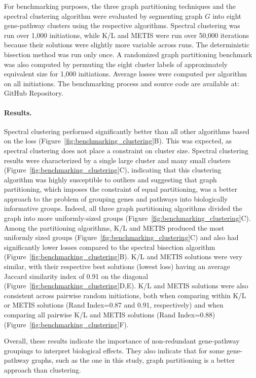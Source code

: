 \documentclass[12pt]{article}
\begin{document}
For benchmarking purposes, the three graph partitioning techniques and the spectral clustering algorithm were evaluated by segmenting graph $G$ into eight gene-pathway clusters using the respective algorithms. Spectral clustering was run over 1,000 initiations, while K/L and METIS were run over 50,000 iterations because their solutions were slightly more variable across runs. The deterministic bisection method was run only once. A randomized graph partitioning benchmark was also computed by permuting the eight cluster labels of approximately equivalent size for 1,000 initiations. Average losses were computed per algorithm on all initiations. The benchmarking process and source code are available at: GitHub Repository.

\paragraph{Results.}
Spectral clustering performed significantly better than all other algorithms based on the loss (Figure~\ref{fig:benchmarking_clustering}B). This was expected, as spectral clustering does not place a constraint on cluster size. Spectral clustering results were characterized by a single large cluster and many small clusters (Figure~\ref{fig:benchmarking_clustering}C), indicating that this clustering algorithm was highly susceptible to outliers and suggesting that graph partitioning, which imposes the constraint of equal partitioning, was a better approach to the problem of grouping genes and pathways into biologically informative groups. Indeed, all three graph partitioning algorithms divided the graph into more uniformly-sized groups (Figure~\ref{fig:benchmarking_clustering}C). Among the partitioning algorithms, K/L and METIS produced the most uniformly sized groups (Figure~\ref{fig:benchmarking_clustering}C) and also had significantly lower losses compared to the spectral bisection algorithm (Figure~\ref{fig:benchmarking_clustering}B). K/L and METIS solutions were very similar, with their respective best solutions (lowest loss) having an average Jaccard similarity index of 0.91 on the diagonal (Figure~\ref{fig:benchmarking_clustering}D,E). K/L and METIS solutions were also consistent across pairwise random initiations, both when comparing within K/L or METIS solutions (Rand Index=0.87 and 0.91, respectively) and when comparing all pairwise K/L and METIS solutions (Rand Index=0.88) (Figure~\ref{fig:benchmarking_clustering}F).

Overall, these results indicate the importance of non-redundant gene-pathway groupings to interpret biological effects. They also indicate that for some gene-pathway graphs, such as the one in this study, graph partitioning is a better approach than clustering.
 \clearpage
\end{document}
